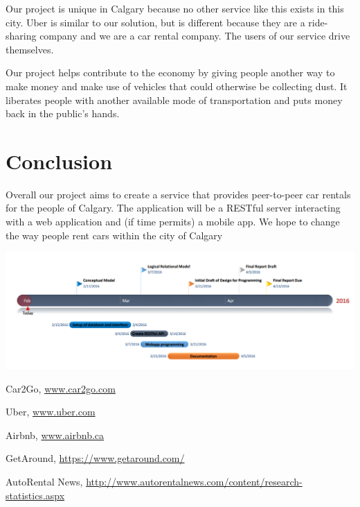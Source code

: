 \documentclass{article}
\begin{document}
Our project is unique in Calgary because no other service like this exists in
this city. Uber is similar to our solution, but is different because they are a
ride-sharing company and we are a car rental company. The users of our service
drive themselves.

Our project helps contribute to the economy by giving people another way to
make money and make use of vehicles that could otherwise be collecting dust. It
liberates people with another available mode of transportation and puts money
back in the public's hands.

\section{Conclusion}
Overall our project aims to create a service that provides peer-to-peer car rentals for the people of Calgary.
The application will be a RESTful server interacting with a web application and (if time permits) a mobile app.
We hope to change the way people rent cars within the city of Calgary

\includegraphics[scale=0.45,keepaspectratio]{Timeline}
\begin{thebibliography}{9}

  Car2Go,
  \url{www.car2go.com}

  Uber,
  \url{www.uber.com}

  Airbnb,
  \url{www.airbnb.ca}

  GetAround,
  \url{https://www.getaround.com/}

  AutoRental News,
  \url{http://www.autorentalnews.com/content/research-statistics.aspx}

\end{thebibliography}
\end{document}
